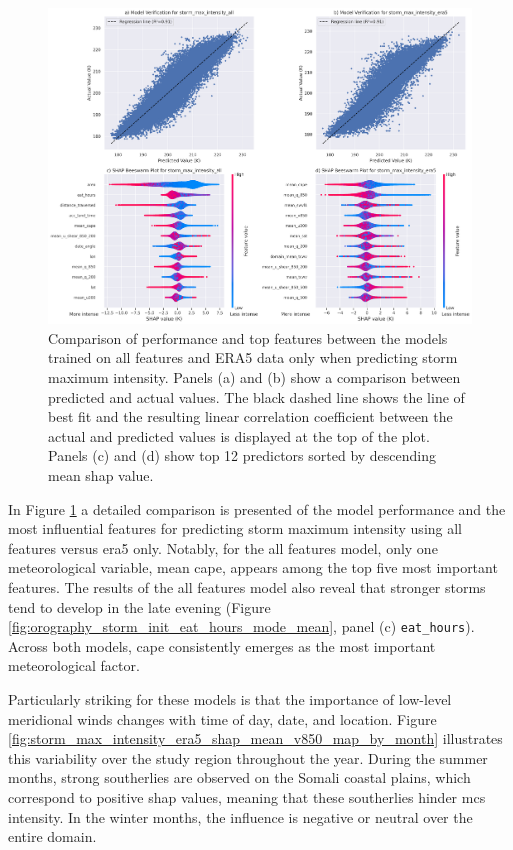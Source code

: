 \begin{figure}[ht]
    \centering
    \includegraphics[width=\textwidth]{../figures/generated/experiments/storm_max_intensity/storm_max_intensity_summary.png}
    \caption{Comparison of performance and top features between the models trained on all features and ERA5 data only when predicting storm maximum intensity. Panels (a) and (b) show a comparison between predicted and actual values. The black dashed line shows the line of best fit and the resulting linear correlation coefficient between the actual and predicted values is displayed at the top of the plot. Panels (c) and (d) show top 12 predictors sorted by descending mean \acrshort{shap} value.}
    \label{fig:storm_max_intensity_summary}
\end{figure}

In Figure \ref{fig:storm_max_intensity_summary} a detailed comparison is presented of the model performance and the most influential features for predicting storm maximum intensity using all features versus \acrshort{era5} only. Notably, for the all features model, only one meteorological variable, mean \acrshort{cape}, appears among the top five most important features. The results of the all features model also reveal that stronger storms tend to develop in the late evening (Figure \ref{fig:orography_storm_init_eat_hours_mode_mean}, panel (c) \texttt{eat\_hours}). Across both models, \acrshort{cape} consistently emerges as the most important meteorological factor.

Particularly striking for these models is that the importance of low-level meridional winds changes with time of day, date, and location. Figure \ref{fig:storm_max_intensity_era5_shap_mean_v850_map_by_month} illustrates this variability over the study region throughout the year. During the summer months, strong southerlies are observed on the Somali coastal plains, which correspond to positive \acrshort{shap} values, meaning that these southerlies hinder \acrshort{mcs} intensity. In the winter months, the influence is negative or neutral over the entire domain.

